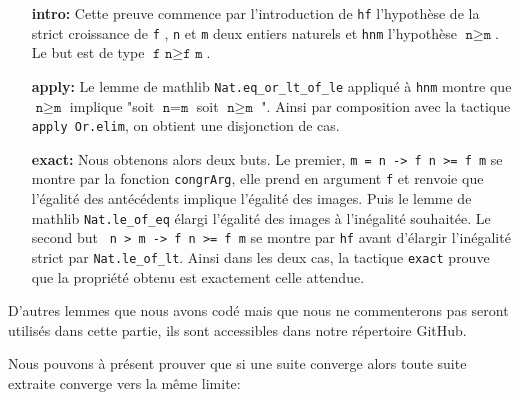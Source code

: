 \documentclass[a4paper, 12pt]{article}
\newcommand{\lean}[1]{\texttt{#1}}
\begin{document}
\begin{itemize} [  align=left,  itemsep=20pt ]
    \item[\textbf{intro:}] Cette preuve commence par l'introduction de \lean{hf} l'hypothèse de la strict croissance de \lean{f} , \lean{n} et \lean{m} deux entiers naturels et
    \lean{hnm} l'hypothèse $ \lean{n} \geq \lean{m} $. Le but est de type $ \lean{f n} \geq \lean{f m} $. 

    \item[\textbf{apply:}] Le lemme de mathlib \lean{Nat.eq_or_lt_of_le} appliqué à \lean{hnm} montre que $ \lean{n} \geq \lean{m} $ implique "soit $ \lean{n} = \lean{m} $ soit $
    \lean{n} \geq \lean{m} $ ". Ainsi par composition avec la tactique \lean{apply Or.elim}, on obtient une disjonction de cas.

    \item[\textbf{exact:}] Nous obtenons alors deux buts. Le premier, \lean{m = n -> f n >=  f m}  se montre par la fonction \lean{congrArg}, elle prend en argument \lean{f} et renvoie
    que l'égalité des antécédents implique l'égalité des images.  Puis le lemme de mathlib \lean{Nat.le_of_eq} élargi l'égalité des images à l'inégalité souhaitée. Le second but \lean{
    n > m -> f n >= f m} se montre par \lean{hf} avant d'élargir l'inégalité strict par \lean{Nat.le_of_lt}. Ainsi dans les deux cas, la tactique \lean{exact} prouve que la propriété
    obtenu est exactement celle attendue.

    
    
\end{itemize}


\vspace{\baselineskip} 

D'autres lemmes que nous avons codé mais que nous ne commenterons pas seront utilisés dans cette partie, ils sont accessibles dans notre répertoire GitHub. %

    

Nous pouvons à présent prouver que si une suite converge alors toute suite extraite converge vers la même limite:    
\end{document}
